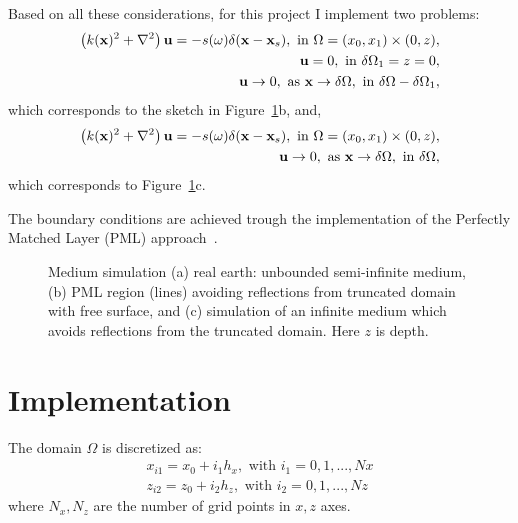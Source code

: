 \documentclass[10pt]{article}
\begin{document}
Based on all these considerations, for this project I implement two problems:
\begin{eqnarray}
\nonumber \left(k({\bf x})^2 + \nabla^2 \right)  {\bf u}  = -s(\omega)\delta({\bf x}-{\bf x}_s),  \text{ in }\Omega = (x_0,x_1)\times(0,z), \\
{\bf u} = 0, \text{  in }\delta\Omega_1 = z =0, \\
\nonumber {\bf u} \rightarrow 0, \text{ as } {\bf x} \rightarrow \delta \Omega,\text{  in } \delta \Omega -\delta \Omega_1,
\label{eq:profree}
\end{eqnarray}
which corresponds to the sketch in Figure~\ref{fig:domain}b, and,
\begin{eqnarray}
\nonumber \left(k({\bf x})^2 + \nabla^2 \right)  {\bf u}  = -s(\omega)\delta({\bf x}-{\bf x}_s),  \text{ in }\Omega = (x_0,x_1)\times(0,z), \\
{\bf u} \rightarrow 0, \text{ as } {\bf x} \rightarrow \delta \Omega,\text{  in } \delta \Omega,
\label{eq:proabc}
\end{eqnarray}
which corresponds to Figure~\ref{fig:domain}c.

The boundary conditions are achieved trough the implementation of the Perfectly Matched Layer (PML) approach~\cite{BerengerPML}.


\begin{figure}
\centering
{}
\caption{Medium simulation (a) real earth: unbounded semi-infinite medium, (b) PML region (lines) avoiding reflections
        from truncated domain with free surface, and (c) simulation of an infinite medium which avoids reflections
        from the truncated domain. Here $z$ is depth.}
\label{fig:domain}
\end{figure}


\section{Implementation}

The domain $\Omega$ is discretized as:
\begin{eqnarray}
 \nonumber x_{i1} = x_0 +i_1 h_x, \text{ with } i_1 = 0,1,...,Nx\\
 z_{i2} = z_0 +i_2 h_z, \text{ with } i_2 = 0,1,...,Nz
\end{eqnarray}
where $N_x,N_z$ are the number of grid points in $x,z$ axes.
\end{document}
